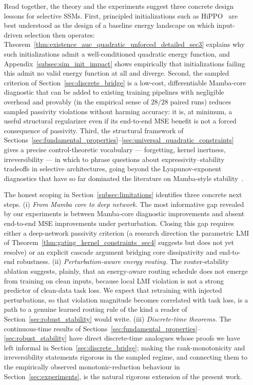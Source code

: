 \documentclass[10pt]{article} %
\theoremstyle{definition}
\begin{document}
Read together, the theory and the experiments suggest three concrete design lessons for selective SSMs. First, principled initializations such as HiPPO~\citep{gu2020hippo} are best understood as the design of a baseline energy landscape on which input-driven selection then operates: Theorem~\ref{thm:existence_auc_quadratic_unforced_detailed_sec3} explains why such initializations admit a well-conditioned quadratic energy function, and Appendix~\ref{subsec:sim_init_impact} shows empirically that initializations failing this admit no valid energy function at all and diverge. Second, the sampled criterion of Section~\ref{sec:discrete_bridge} is a low-cost, differentiable Mamba-core diagnostic that can be added to existing training pipelines with negligible overhead and provably (in the empirical sense of $28/28$ paired runs) reduces sampled passivity violations without harming accuracy: it is, at minimum, a useful structural regularizer even if its end-to-end MSE benefit is not a forced consequence of passivity. Third, the structural framework of Sections~\ref{sec:fundamental_properties}--\ref{sec:universal_quadratic_constraints} gives a precise control-theoretic vocabulary --- forgetting, kernel inertness, irreversibility --- in which to phrase questions about expressivity--stability tradeoffs in selective architectures, going beyond the Lyapunov-exponent diagnostics that have so far dominated the literature on Mamba-style stability~\citep{halloran2024mamba}.

The honest scoping in Section~\ref{subsec:limitations} identifies three concrete next steps. (i) \emph{From Mamba core to deep network.} The most informative gap revealed by our experiments is between Mamba-core diagnostic improvements and absent end-to-end MSE improvements under perturbation. Closing this gap requires either a deep-network passivity criterion (a research direction the parametric LMI of Theorem~\ref{thm:gating_kernel_constraints_sec4} suggests but does not yet resolve) or an explicit cascade argument bridging core dissipativity and end-to-end robustness. (ii) \emph{Perturbation-aware energy routing.} The router-stability ablation suggests, plainly, that an energy-aware routing schedule does not emerge from training on clean inputs, because local LMI violation is not a strong predictor of clean-data task loss. We expect that retraining with injected perturbations, so that violation magnitude becomes correlated with task loss, is a path to a genuine learned routing rule of the kind a reader of Section~\ref{sec:robust_stability} would write. (iii) \emph{Discrete-time theorems.} The continuous-time results of Sections~\ref{sec:fundamental_properties}--\ref{sec:robust_stability} have direct discrete-time analogues whose proofs we have left informal in Section~\ref{sec:discrete_bridge}; making the rank-monotonicity and irreversibility statements rigorous in the sampled regime, and connecting them to the empirically observed monotonic-reduction behaviour in Section~\ref{sec:experiments}, is the natural rigorous extension of the present work.
\end{document}
